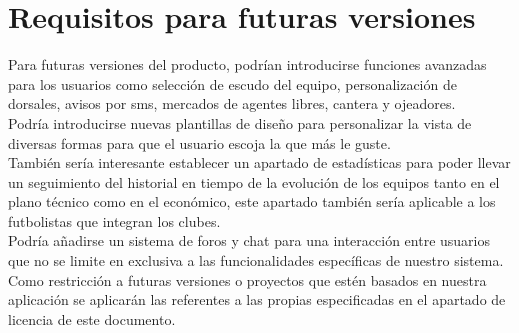 \section{Requisitos para futuras versiones}
Para futuras versiones del producto, podrían introducirse funciones
avanzadas para los usuarios como selección de escudo del equipo,
personalización de dorsales, avisos por sms, mercados de agentes
libres, cantera y ojeadores.\\

Podría introducirse nuevas plantillas de diseño para personalizar la
vista de diversas formas para que el usuario escoja la que más le
guste.\\

También sería interesante establecer un apartado de estadísticas para
poder llevar un seguimiento del historial en tiempo de la evolución de
los equipos tanto en el plano técnico como en el económico, este
apartado también sería aplicable a los futbolistas que integran los
clubes.\\

Podría añadirse un sistema de foros y chat para una interacción entre
usuarios que no se limite en exclusiva a las funcionalidades
específicas de nuestro sistema.\\

Como restricción a futuras versiones o proyectos que estén basados en
nuestra aplicación se aplicarán las referentes a las propias
especificadas en el apartado de licencia de este documento.